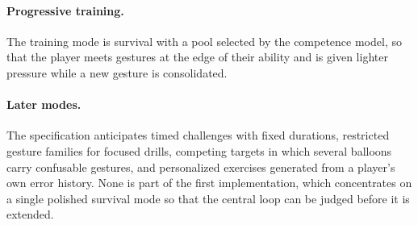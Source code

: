 \paragraph{Progressive training.} The training mode is survival with a pool selected by the competence model, so that the player meets gestures at the edge of their ability and is given lighter pressure while a new gesture is consolidated.

\paragraph{Later modes.} The specification anticipates timed challenges with fixed durations, restricted gesture families for focused drills, competing targets in which several balloons carry confusable gestures, and personalized exercises generated from a player's own error history. None is part of the first implementation, which concentrates on a single polished survival mode so that the central loop can be judged before it is extended.\evS
